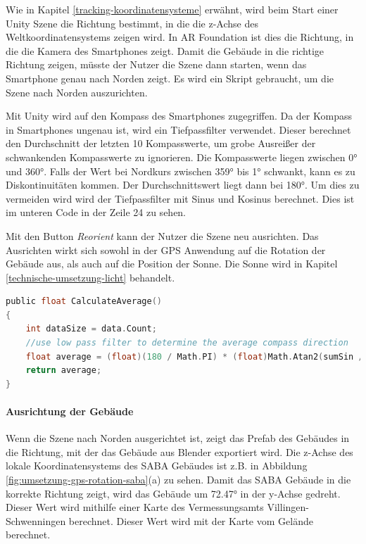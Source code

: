 \label{umsetzung-gps-ausrichtung-nach-norden}
Wie in Kapitel \ref*{tracking-koordinatensysteme} erwähnt, wird beim Start einer Unity Szene die Richtung bestimmt, in die die z-Achse des Weltkoordinatensystems zeigen wird. In AR Foundation ist dies die Richtung, in die die Kamera des Smartphones zeigt. Damit die Gebäude in die richtige Richtung zeigen, müsste der Nutzer die Szene dann starten, wenn das Smartphone genau nach Norden zeigt. Es wird ein Skript gebraucht, um die Szene nach Norden auszurichten. 

Mit Unity wird auf den Kompass des Smartphones zugegriffen. Da der Kompass in Smartphones ungenau ist, wird ein Tiefpassfilter verwendet. Dieser berechnet den Durchschnitt der letzten 10 Kompasswerte, um grobe Ausreißer der schwankenden Kompasswerte zu ignorieren. Die Kompasswerte liegen zwischen 0° und 360°. Falls der Wert bei Nordkurs zwischen 359° bis 1° schwankt, kann es zu Diskontinuitäten kommen. Der Durchschnittswert liegt dann bei 180°. Um dies zu vermeiden wird wird der Tiefpassfilter mit Sinus und Kosinus berechnet. Dies ist im unteren Code in der Zeile 24 zu sehen. 

Mit den Button \textit{Reorient} kann der Nutzer die Szene neu ausrichten. Das Ausrichten wirkt sich sowohl in der GPS Anwendung auf die Rotation der Gebäude aus, als auch auf die Position der Sonne. Die Sonne wird in Kapitel \ref*{technische-umsetzung-licht} behandelt.

\begin{lstlisting}[language=C,caption={Der Tiefpassfilter im \texttt{ReorientToNorth.cs} Skript},captionpos=b,label=lst:tiefpassfilter]
public float CalculateAverage()
{
    int dataSize = data.Count;
    //use low pass filter to determine the average compass direction
    float average = (float)(180 / Math.PI) * (float)Math.Atan2(sumSin / dataSize, sumCos / dataSize);
    return average;
}
\end{lstlisting}

\paragraph*{Ausrichtung der Gebäude}
Wenn die Szene nach Norden ausgerichtet ist, zeigt das Prefab des Gebäudes in die Richtung, mit der das Gebäude aus Blender exportiert wird. Die z-Achse des lokale Koordinatensystems des SABA Gebäudes ist z.B. in Abbildung \ref*{fig:umsetzung-gps-rotation-saba}(a) zu sehen. Damit das SABA Gebäude in die korrekte Richtung zeigt, wird das Gebäude um 72.47° in der y-Achse gedreht. Dieser Wert wird mithilfe einer Karte des Vermessungsamts Villingen-Schwenningen berechnet. Dieser Wert wird mit der Karte vom Gelände berechnet.

